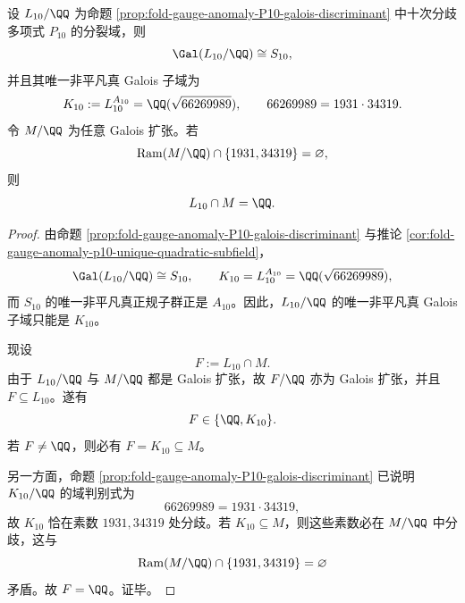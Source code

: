 \begin{theorem}\label{thm:xi-time-part75-p10-shadow-universal-ramification-shielding}
设 \(L_{10}/\QQ\) 为命题 \ref{prop:fold-gauge-anomaly-P10-galois-discriminant} 中十次分歧多项式 \(P_{10}\) 的分裂域，则
\[
\Gal(L_{10}/\QQ)\cong S_{10},
\]
并且其唯一非平凡真 Galois 子域为
\[
K_{10}:=L_{10}^{A_{10}}=\QQ(\sqrt{66269989}),
\qquad
66269989=1931\cdot 34319.
\]
令 \(M/\QQ\) 为任意 Galois 扩张。若
\[
\operatorname{Ram}(M/\QQ)\cap\{1931,34319\}=\varnothing,
\]
则
\[
L_{10}\cap M=\QQ.
\]
\end{theorem}
\begin{proof}
由命题 \ref{prop:fold-gauge-anomaly-P10-galois-discriminant} 与推论 \ref{cor:fold-gauge-anomaly-p10-unique-quadratic-subfield}，
\[
\Gal(L_{10}/\QQ)\cong S_{10},
\qquad
K_{10}=L_{10}^{A_{10}}=\QQ(\sqrt{66269989}),
\]
而 \(S_{10}\) 的唯一非平凡真正规子群正是 \(A_{10}\)。因此，\(L_{10}/\QQ\) 的唯一非平凡真 Galois 子域只能是 \(K_{10}\)。

现设
\[
F:=L_{10}\cap M.
\]
由于 \(L_{10}/\QQ\) 与 \(M/\QQ\) 都是 Galois 扩张，故 \(F/\QQ\) 亦为 Galois 扩张，并且 \(F\subseteq L_{10}\)。遂有
\[
F\in\{\QQ,K_{10}\}.
\]
若 \(F\neq \QQ\)，则必有 \(F=K_{10}\subseteq M\)。

另一方面，命题 \ref{prop:fold-gauge-anomaly-P10-galois-discriminant} 已说明 \(K_{10}/\QQ\) 的域判别式为
\[
66269989=1931\cdot 34319,
\]
故 \(K_{10}\) 恰在素数 \(1931,34319\) 处分歧。若 \(K_{10}\subseteq M\)，则这些素数必在 \(M/\QQ\) 中分歧，这与
\[
\operatorname{Ram}(M/\QQ)\cap\{1931,34319\}=\varnothing
\]
矛盾。故 \(F=\QQ\)。证毕。
\end{proof}

